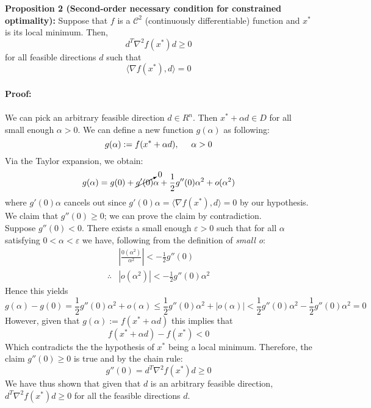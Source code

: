 \textbf{Proposition 2 (Second-order necessary condition for constrained optimality):} Suppose that $f$ is a $\mathcal{C}^2$ (continuously differentiable) function and $x^*$ is its local minimum. Then,
\begin{equation}
    d^T \nabla ^2 f(x^*) d \geq 0
\end{equation}
for all feasible directions $d$ such that
\begin{equation}
    \langle \nabla f (x^*), d \rangle = 0
\end{equation}
\\
\textbf{Proof:}\\
\\
We can pick an arbitrary feasible direction $d \in R^n$. Then $ x^* + \alpha d \in D$ for all small enough $\alpha > 0$. We can define a new function $g(\alpha)$ as following:
\begin{equation}
    g(\alpha) := f(x^* + \alpha d), \hspace{0.5cm} \alpha > 0
\end{equation}
Via the Taylor expansion, we obtain:
\begin{equation}
    g(\alpha) = g(0) + \cancelto{0}{g'(0)}\alpha + \frac{1}{2} g''(0) \alpha^2 + o(\alpha^2)
\end{equation}
where $g'(0)\alpha$ cancels out since $ g'(0)\alpha = \langle \nabla f (x^*), d \rangle = 0 $ by our hypothesis. We claim that $g''(0) \geq 0$; we can prove the claim by contradiction.\\
Suppose $g''(0) < 0$. There exists a small enough $\varepsilon > 0$ such that for all $\alpha$ satisfying $0 < \alpha < \varepsilon$ we have, following from the definition of \emph{small o}:
\begin{align}
    &\left| \frac{0(\alpha^2)}{\alpha^2} \right| < - \frac{1}{2} g''(0) \\
    \therefore&\left| o(\alpha^2) \right| < - \frac{1}{2} g''(0)\alpha^2
\end{align}
Hence this yields
\begin{equation}
    g(\alpha) - g(0) = \frac{1}{2}g''(0) \alpha^2 + o(\alpha) \leq  \frac{1}{2}g''(0) \alpha^2 + \left| o(\alpha) \right| < \frac{1}{2}g''(0) \alpha^2 - \frac{1}{2}g''(0) \alpha^2 = 0
\end{equation}
However, given that $g(\alpha) := f(x^* + \alpha d)$ this implies that
\begin{equation}
    f(x^* + \alpha d) - f(x^*) < 0
\end{equation}
Which contradicts the the hypothesis of $x^*$ being a local minimum. Therefore, the claim $g''(0) \geq 0$ is true and by the chain rule:
\begin{equation}
    g''(0) = d^T \nabla^2 f(x^*) d \geq 0
\end{equation}
We have thus shown that given that $d$ is an arbitrary feasible direction, $d^T \nabla^2 f(x^*) d \geq 0$ for all the feasible directions $d$.
\QEDB

